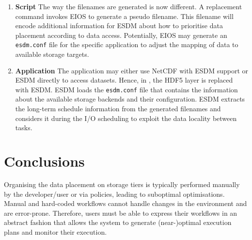 \documentclass[a4paper]{article}
\begin{document}
\begin{enumerate}
  \item \textbf{Script}
  The way the filenames are generated is now different. A replacement command invokes EIOS to generate a pseudo filename.
  This filename will encode additional information for ESDM about how to prioritise data placement according to data access.
  Potentially, EIOS may generate an \texttt{esdm.conf} file for the specific application to adjust the mapping of data to available storage targets.

  \item \textbf{Application}
  The application may either use NetCDF with ESDM support or ESDM directly to access datasets.
  Hence, in , the HDF5 layer is replaced with ESDM.
  ESDM loads the \texttt{esdm.conf} file that contains the information about the available storage backends and their configuration.
  ESDM extracts the long-term schedule information from the generated filenames and considers it during the I/O scheduling to exploit the data locality between tasks.

\end{enumerate}



\section{Conclusions}
\label{sec:conclusions}

Organising the data placement on storage tiers is typically performed manually by the developer/user or via policies, leading to suboptimal optimisations.
Manual and hard-coded workflows cannot handle changes in the environment and are error-prone.
Therefore, users must be able to express their workflows in an abstract fashion that allows the system to generate (near-)optimal execution plans and monitor their execution.
\end{document}
